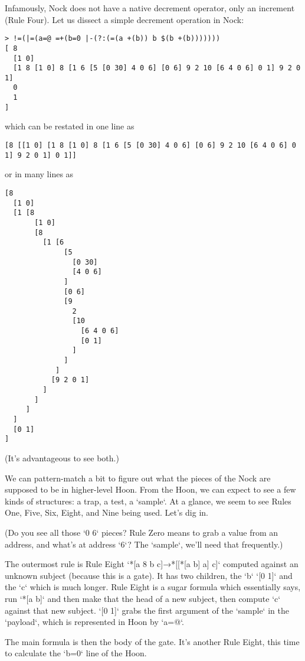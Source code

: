 Infamously, Nock does not have a native decrement operator, only an increment (Rule Four).  Let us dissect a simple decrement operation in Nock:

\begin{lstlisting}[style=nonumbers]
> !=(|=(a=@ =+(b=0 |-(?:(=(a +(b)) b $(b +(b)))))))
[ 8
  [1 0]
  [1 8 [1 0] 8 [1 6 [5 [0 30] 4 0 6] [0 6] 9 2 10 [6 4 0 6] 0 1] 9 2 0 1]
  0
  1
]
\end{lstlisting}

which can be restated in one line as

\begin{lstlisting}[style=nonumbers]
[8 [[1 0] [1 8 [1 0] 8 [1 6 [5 [0 30] 4 0 6] [0 6] 9 2 10 [6 4 0 6] 0 1] 9 2 0 1] 0 1]]
\end{lstlisting}

or in many lines as

\begin{lstlisting}[style=numbers]
[8
  [1 0]
  [1 [8
       [1 0]
       [8
         [1 [6
              [5
                [0 30]
                [4 0 6]
              ]
              [0 6]
              [9
                2
                [10
                  [6 4 0 6]
                  [0 1]
                ]
              ]
            ]
           [9 2 0 1]
         ]
       ]
     ]
  ]
  [0 1]
]
\end{lstlisting}

(It's advantageous to see both.)

We can pattern-match a bit to figure out what the pieces of the Nock are supposed to be in higher-level Hoon.  From the Hoon, we can expect to see a few kinds of structures:  a trap, a test, a `sample`.  At a glance, we seem to see Rules One, Five, Six, Eight, and Nine being used.  Let's dig in.

(Do you see all those `0 6` pieces?  Rule Zero means to grab a value from an address, and what's at address `6`?  The `sample`, we'll need that frequently.)

The outermost rule is Rule Eight `*[a 8 b c]→*[[*[a b] a] c]` computed against an unknown subject (because this is a gate).  It has two children, the `b` `[0 1]` and the `c` which is much longer.  Rule Eight is a sugar formula which essentially says, run `*[a b]` and then make that the head of a new subject, then compute `c` against that new subject.  `[0 1]` grabs the first argument of the `sample` in the `payload`, which is represented in Hoon by `a=@`.

The main formula is then the body of the gate.  It's another Rule Eight, this time to calculate the `b=0` line of the Hoon.

